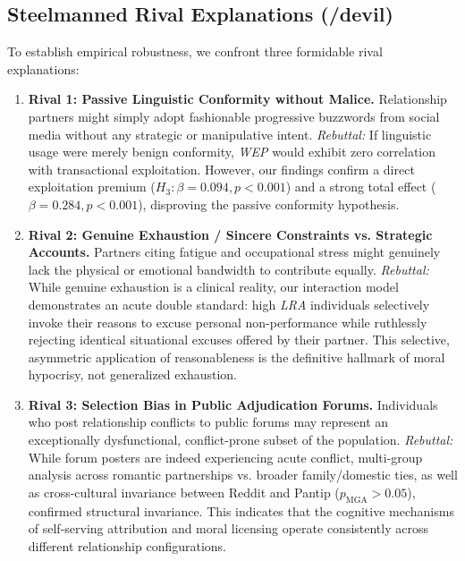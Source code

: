 \subsection{Steelmanned Rival Explanations (/devil)}
To establish empirical robustness, we confront three formidable rival explanations:
\begin{enumerate}[leftmargin=*]
    \item \textbf{Rival 1: Passive Linguistic Conformity without Malice.} Relationship partners might simply adopt fashionable progressive buzzwords from social media without any strategic or manipulative intent.
    \textit{Rebuttal:} If linguistic usage were merely benign conformity, \textit{WEP} would exhibit zero correlation with transactional exploitation. However, our findings confirm a direct exploitation premium ($H_3: \beta = 0.094, p < 0.001$) and a strong total effect ($\beta = 0.284, p < 0.001$), disproving the passive conformity hypothesis.
    \item \textbf{Rival 2: Genuine Exhaustion / Sincere Constraints vs. Strategic Accounts.} Partners citing fatigue and occupational stress might genuinely lack the physical or emotional bandwidth to contribute equally.
    \textit{Rebuttal:} While genuine exhaustion is a clinical reality, our interaction model demonstrates an acute double standard: high \textit{LRA} individuals selectively invoke their reasons to excuse personal non-performance while ruthlessly rejecting identical situational excuses offered by their partner. This selective, asymmetric application of reasonableness is the definitive hallmark of moral hypocrisy, not generalized exhaustion.
    \item \textbf{Rival 3: Selection Bias in Public Adjudication Forums.} Individuals who post relationship conflicts to public forums may represent an exceptionally dysfunctional, conflict-prone subset of the population.
    \textit{Rebuttal:} While forum posters are indeed experiencing acute conflict, multi-group analysis across romantic partnerships vs. broader family/domestic ties, as well as cross-cultural invariance between Reddit and Pantip ($p_{\text{MGA}} > 0.05$), confirmed structural invariance. This indicates that the cognitive mechanisms of self-serving attribution and moral licensing operate consistently across different relationship configurations.
\end{enumerate}

